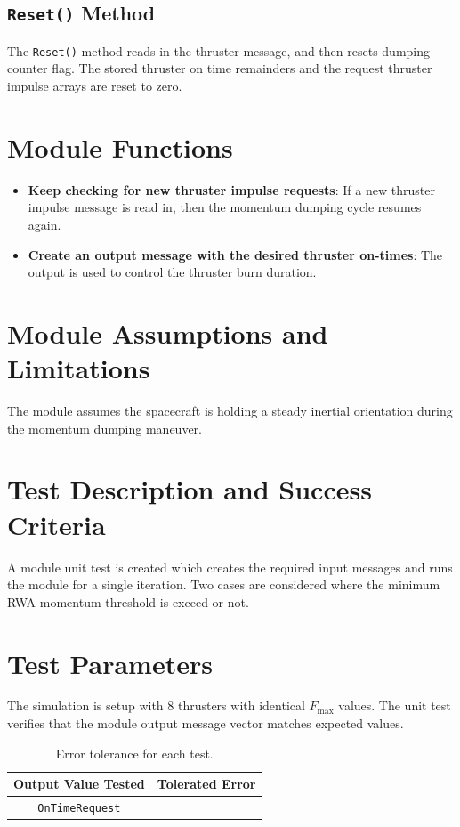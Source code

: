 \documentclass[]{BasiliskReportMemo}
\begin{document}
\subsection{{\tt Reset()} Method}
The {\tt Reset()} method reads in the thruster message, and then resets dumping counter flag.  The stored thruster on time remainders and the request thruster impulse arrays are reset to zero.  









\section{Module Functions}
\begin{itemize}
	\item \textbf{Keep checking for new thruster impulse requests}: If a new thruster impulse message is read in, then the momentum dumping cycle resumes again.
	\item \textbf{Create an output message with the desired thruster on-times}: The output is used to control the thruster burn duration.
\end{itemize}

\section{Module Assumptions and Limitations}
The module assumes the spacecraft is holding a steady inertial orientation during the momentum dumping maneuver.  










\section{Test Description and Success Criteria}
A module unit test is created which creates the required input messages and runs the module for a single iteration.  Two cases are considered where the minimum RWA momentum threshold is exceed or not.




\section{Test Parameters}
The simulation is setup with 8 thrusters  with identical $F_{\text{max}}$ values.  
The unit test verifies that the module output  message vector matches expected values.
\begin{table}[htbp]
	\caption{Error tolerance for each test.}
	\label{tab:errortol}
	\centering \fontsize{10}{10}\selectfont
	\begin{tabular}{ c | c } %
		\hline\hline
		\textbf{Output Value Tested}  & \textbf{Tolerated Error}  \\ 
		\hline
		{\tt OnTimeRequest}        & 	   \\ 
		\hline\hline
	\end{tabular}
\end{table}
\end{document}
